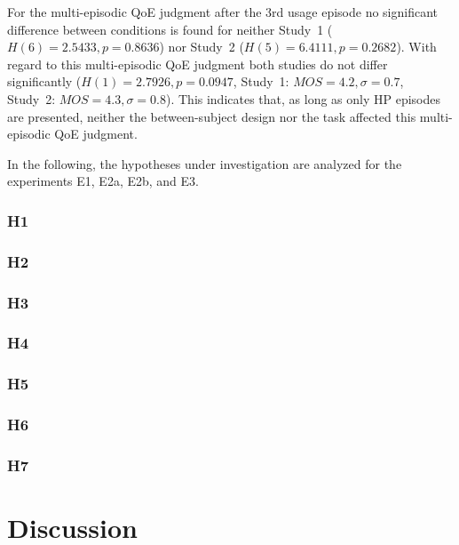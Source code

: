 For the multi-episodic QoE judgment after the 3rd usage episode no significant difference between conditions is found for neither Study~1 ($H(6)=2.5433, p=0.8636$) nor Study~2 ($H(5)=6.4111, p=0.2682$).
With regard to this multi-episodic QoE judgment both studies do not differ significantly ($H(1)=2.7926, p=0.0947$, Study~1: $MOS=4.2, \sigma=0.7$, Study~2: $MOS=4.3, \sigma=0.8$).
This indicates that, as long as only HP episodes are presented, neither the between-subject design nor the task affected this multi-episodic QoE judgment.

In the following, the hypotheses under investigation are analyzed for the experiments E1, E2a, E2b, and E3.

\subsubsection{H1}
\subsubsection{H2}
\subsubsection{H3}
\subsubsection{H4}
\subsubsection{H5}
\subsubsection{H6}
\subsubsection{H7}

\section{Discussion}
